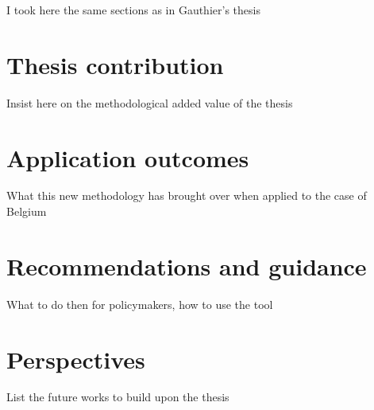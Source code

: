 I took here the same sections as in Gauthier's thesis
\section*{Thesis contribution}
Insist here on the methodological added value of the thesis

\section*{Application outcomes}
What this new methodology has brought over when applied to the case of Belgium

\section*{Recommendations and guidance}
What to do then for policymakers, how to use the tool

\section*{Perspectives}
List the future works to build upon the thesis